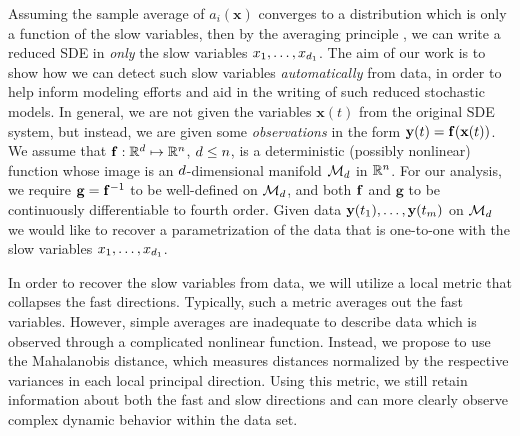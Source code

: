 Assuming the sample average of $a_i(\mathbf{x})$ converges to a distribution which is only a function of the slow variables, then by the averaging principle \cite{freidlin2012random}, we can write a reduced SDE in {\em only} the slow variables $x_1, \dots, x_{{d_1}}$.
%
The aim of our work is to show how we can detect such slow variables {\em automatically} from data, in order to help inform modeling efforts and aid in the writing of such reduced stochastic models.
%
In general, we are not given the variables $\mathbf{x}(t)$ from the original SDE system, but instead, we are given some {\em observations}
 in the form $\mathbf{y}(t) = \mathbf{f} (\mathbf{x}(t))$.
%
We assume that $\mathbf{f}: \mathbb{R}^d \mapsto \mathbb{R}^n$, $d \le n$, is a deterministic (possibly nonlinear) function whose image is an $d$-dimensional manifold $\mathcal{M}_d$ in $\mathbb{R}^n$.
%
%
For our analysis, we require $\mathbf{g} = \mathbf{f} ^{-1}$ to be well-defined on $\mathcal{M}_d$, and both $\mathbf{f}$ and $\mathbf{g}$ to be continuously differentiable to fourth order.
%
Given data $\mathbf{y}(t_1),\ldots,\mathbf{y}(t_m)$ on $\mathcal{M}_d$ we would like to recover a parametrization of the data that is one-to-one with the
slow variables $x_1, \dots, x_{d_1}$.


In order to recover the slow variables from data, we will utilize a local metric that collapses the fast directions.
%
Typically, such a metric averages out the fast variables.
%
However, simple averages are inadequate to describe data which is observed through a complicated nonlinear function.
%
Instead, we propose to use the Mahalanobis distance, which measures distances normalized by the respective variances in each local principal direction.
%
Using this metric, we still retain information about both the fast and slow directions and can
more clearly observe complex dynamic behavior within the data set.

